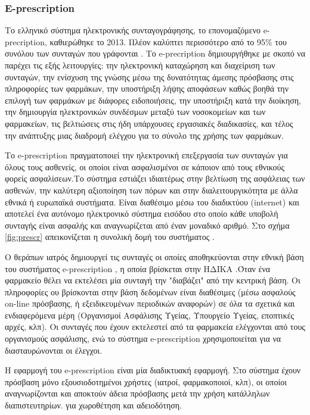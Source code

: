	\subsubsection{E-prescription }
	
		Το ελληνικό σύστημα ηλεκτρονικής συνταγογράφησης,  το επονομαζόμενο e-precription, καθιερώθηκε το 2013. Πλέον καλύπτει περισσότερο  από το 95\% του συνόλου των συνταγών που γράφονται . Το e-precription δημιουργήθηκε με σκοπό να παρέχει τις εξής λειτουργίες: την ηλεκτρονική καταχώρηση και διαχείριση των συνταγών, την ενίσχυση της γνώσης μέσω της δυνατότητας άμεσης πρόσβασης στις πληροφορίες των φαρμάκων, την υποστήριξη λήψης αποφάσεων καθώς βοηθά την επιλογή των φαρμάκων με διάφορες ειδοποιήσεις, την υποστήριξη κατά την διοίκηση, την δημιουργία ηλεκτρονικών συνδέσμων μεταξύ των νοσοκομείων και των φαρμακείων, τις βελτιώσεις στις ήδη υπάρχουσες εργασιακές διαδικασίες, και τέλος την ανάπτυξης μιας διαδρομή ελέγχου για το σύνολο της χρήσης των φαρμάκων.  \cite{miller}
		
		Το e-prescription πραγματοποιεί την ηλεκτρονική επεξεργασία των συνταγών για όλους τους ασθενείς, οι οποίοι είναι ασφαλισμένοι σε κάποιον από τους εθνικούς φορείς ασφαλίσεων.Το σύστημα εστιάζει ιδιαιτέρως στην βελτίωση της ασφάλειας των ασθενών, την καλύτερη αξιοποίηση των πόρων και στην διαλειτουργικότητα με άλλα εθνικά ή ευρωπαϊκά συστήματα. Είναι διαθέσιμο μέσω του διαδικτύου (internet) και αποτελεί ένα αυτόνομο ηλεκτρονικό σύστημα εισόδου στο οποίο κάθε υποβολή συνταγής είναι ασφαλής και αναγνωρίζεται από έναν μοναδικό αριθμό. Στο σχήμα \ref{fig:prescr} απεικονίζεται η συνολική δομή του συστήματος \cite{pangalos}.
		
		Ο θεράπων ιατρός δημιουργεί τις συνταγές οι οποίες αποθηκεύονται στην εθνική βάση του συστήματος e-prescription , η οποία βρίσκεται στην ΗΔΙΚΑ \cite{idika}.Όταν ένα φαρμακείο θέλει να εκτελέσει μία συνταγή την  "διαβάζει" από την κεντρική βάση. Οι πληροφορίες ου βρίσκονται στην βάση δεδομένων είναι διαθέσιμες (μέσω ασφαλούς on-line πρόσβασης, ή εξειδικευμένων περιοδικών αναφορών) σε όλα τα σχετικά και ενδιαφερόμενα μέρη (Οργανισμοί Ασφάλισης Υγείας, Υπουργείο Υγείας, εποπτικές αρχές, κλπ). Οι συνταγές που έχουν εκτελεστεί από τα φαρμακεία  ελέγχονται από τους οργανισμούς ασφάλισης, ενώ το σύστημα e-prescription χρησιμοποιείται για να διασταυρώνονται οι έλεγχοι\cite{papala}.

	Η εφαρμογή του e-prescription είναι μία διαδικτυακή εφαρμογή. Στο σύστημα έχουν πρόσβαση μόνο εξουσιοδοτημένοι χρήστες (ιατροί, φαρμακοποιοί, κλπ), οι οποίοι αναγνωρίζονται και αποκτούν άδεια πρόσβασης μετά την χρήση κατάλληλων διαπιστευτηρίων. για χωροθέτηση και αδειοδότηση.
	
